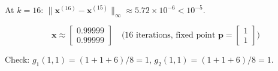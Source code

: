 \documentclass[12pt,letterpaper]{article}
\begin{document}
At $k = 16$: $\|\mathbf{x}^{(16)} - \mathbf{x}^{(15)}\|_\infty \approx 5.72 \times 10^{-6} < 10^{-5}$.

\[
\boxed{\mathbf{x} \approx \begin{bmatrix} 0.99999 \\ 0.99999 \end{bmatrix} \quad \text{(16 iterations, fixed point } \mathbf{p} = \begin{bmatrix} 1 \\ 1 \end{bmatrix}\text{)}}
\]

Check: $g_1(1,1) = (1+1+6)/8 = 1$, \; $g_2(1,1) = (1+1+6)/8 = 1$.

\par
\end{document}
